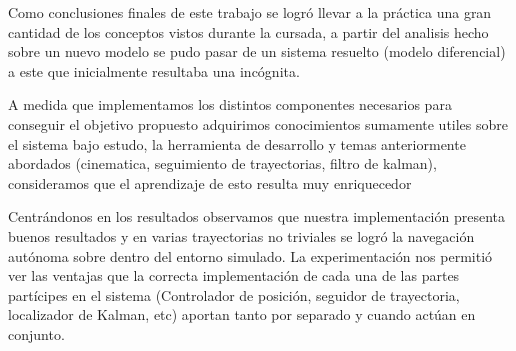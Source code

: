 

Como conclusiones finales de este trabajo se logró llevar a la práctica una gran cantidad de los conceptos vistos durante la cursada, a partir del analisis hecho sobre un nuevo modelo se pudo pasar de un sistema resuelto (modelo diferencial) a este que inicialmente resultaba una incógnita. 

A medida que implementamos los distintos componentes necesarios para conseguir el objetivo propuesto adquirimos conocimientos sumamente utiles sobre el sistema bajo estudo, la herramienta de desarrollo y temas anteriormente abordados (cinematica, seguimiento de trayectorias, filtro de kalman), consideramos que el aprendizaje de esto resulta muy enriquecedor 

Centrándonos en los resultados observamos que nuestra implementación presenta buenos resultados y en varias trayectorias no triviales se logró la navegación autónoma sobre dentro del entorno simulado. La experimentación nos permitió ver las ventajas que la correcta implementación de cada una de las partes partícipes en el sistema (Controlador de posición, seguidor de trayectoria, localizador de Kalman, etc) aportan tanto por separado y cuando actúan en conjunto.



